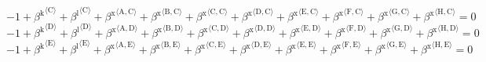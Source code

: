 \begin{equation}
-1 + {\beta^{\mathrm{k}}}^{\langle \mathrm{\mathrm{C}}\rangle} + {\beta^{\mathrm{l}}}^{\langle \mathrm{\mathrm{C}}\rangle} + {\beta^{\mathrm{x}}}^{\langle \mathrm{\mathrm{A}},\mathrm{\mathrm{C}}\rangle} + {\beta^{\mathrm{x}}}^{\langle \mathrm{\mathrm{B}},\mathrm{\mathrm{C}}\rangle} + {\beta^{\mathrm{x}}}^{\langle \mathrm{\mathrm{C}},\mathrm{\mathrm{C}}\rangle} + {\beta^{\mathrm{x}}}^{\langle \mathrm{\mathrm{D}},\mathrm{\mathrm{C}}\rangle} + {\beta^{\mathrm{x}}}^{\langle \mathrm{\mathrm{E}},\mathrm{\mathrm{C}}\rangle} + {\beta^{\mathrm{x}}}^{\langle \mathrm{\mathrm{F}},\mathrm{\mathrm{C}}\rangle} + {\beta^{\mathrm{x}}}^{\langle \mathrm{\mathrm{G}},\mathrm{\mathrm{C}}\rangle} + {\beta^{\mathrm{x}}}^{\langle \mathrm{\mathrm{H}},\mathrm{\mathrm{C}}\rangle} = 0
\end{equation}
\begin{equation}
-1 + {\beta^{\mathrm{k}}}^{\langle \mathrm{\mathrm{D}}\rangle} + {\beta^{\mathrm{l}}}^{\langle \mathrm{\mathrm{D}}\rangle} + {\beta^{\mathrm{x}}}^{\langle \mathrm{\mathrm{A}},\mathrm{\mathrm{D}}\rangle} + {\beta^{\mathrm{x}}}^{\langle \mathrm{\mathrm{B}},\mathrm{\mathrm{D}}\rangle} + {\beta^{\mathrm{x}}}^{\langle \mathrm{\mathrm{C}},\mathrm{\mathrm{D}}\rangle} + {\beta^{\mathrm{x}}}^{\langle \mathrm{\mathrm{D}},\mathrm{\mathrm{D}}\rangle} + {\beta^{\mathrm{x}}}^{\langle \mathrm{\mathrm{E}},\mathrm{\mathrm{D}}\rangle} + {\beta^{\mathrm{x}}}^{\langle \mathrm{\mathrm{F}},\mathrm{\mathrm{D}}\rangle} + {\beta^{\mathrm{x}}}^{\langle \mathrm{\mathrm{G}},\mathrm{\mathrm{D}}\rangle} + {\beta^{\mathrm{x}}}^{\langle \mathrm{\mathrm{H}},\mathrm{\mathrm{D}}\rangle} = 0
\end{equation}
\begin{equation}
-1 + {\beta^{\mathrm{k}}}^{\langle \mathrm{\mathrm{E}}\rangle} + {\beta^{\mathrm{l}}}^{\langle \mathrm{\mathrm{E}}\rangle} + {\beta^{\mathrm{x}}}^{\langle \mathrm{\mathrm{A}},\mathrm{\mathrm{E}}\rangle} + {\beta^{\mathrm{x}}}^{\langle \mathrm{\mathrm{B}},\mathrm{\mathrm{E}}\rangle} + {\beta^{\mathrm{x}}}^{\langle \mathrm{\mathrm{C}},\mathrm{\mathrm{E}}\rangle} + {\beta^{\mathrm{x}}}^{\langle \mathrm{\mathrm{D}},\mathrm{\mathrm{E}}\rangle} + {\beta^{\mathrm{x}}}^{\langle \mathrm{\mathrm{E}},\mathrm{\mathrm{E}}\rangle} + {\beta^{\mathrm{x}}}^{\langle \mathrm{\mathrm{F}},\mathrm{\mathrm{E}}\rangle} + {\beta^{\mathrm{x}}}^{\langle \mathrm{\mathrm{G}},\mathrm{\mathrm{E}}\rangle} + {\beta^{\mathrm{x}}}^{\langle \mathrm{\mathrm{H}},\mathrm{\mathrm{E}}\rangle} = 0
\end{equation}
